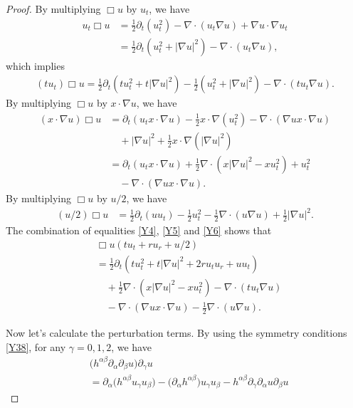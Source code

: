 \documentclass[10pt,a4paper]{amsart}
\begin{document}
\begin{proof}
By multiplying $\Box u$ by $u_t$, we have
\begin{align}\label{Y3}
u_t\Box u&=\frac12\partial_t(u_t^2)-\nabla\cdot(u_t\nabla
u)+\nabla u\cdot\nabla u_t
\nonumber\\&=\frac12\partial_t(u_t^2+|\nabla
u|^2)-\nabla\cdot(u_t\nabla u),
\end{align}
which implies
\begin{align}\label{Y4}
(tu_t)\Box u=\frac12\partial_t(tu_t^2+t|\nabla
u|^2)-\frac12(u_t^2+|\nabla u|^2)-\nabla\cdot(tu_t\nabla u).
\end{align}
By multiplying $\Box u$ by $x\cdot\nabla u$, we have
\begin{align}\label{Y5}
(x\cdot\nabla u)\Box u&=\partial_t(u_tx\cdot\nabla
u)-\frac12x\cdot\nabla(u_t^2)-\nabla\cdot(\nabla ux\cdot\nabla u)
\nonumber\\&\quad+|\nabla u|^2+\frac12x\cdot\nabla(|\nabla u|^2)
\nonumber\\&=\partial_t(u_tx\cdot\nabla
u)+\frac12\nabla\cdot(x|\nabla
u|^2-xu_t^2)+u_t^2\nonumber\\&\quad-\nabla\cdot(\nabla ux\cdot\nabla
u).
\end{align}
By multiplying $\Box u$ by $u/2$, we have
\begin{align}\label{Y6}
(u/2)\Box
u&=\frac12\partial_t(uu_t)-\frac12u_t^2-\frac12\nabla\cdot(u\nabla
u)+\frac12|\nabla u|^2.
\end{align}
The combination of equalities \eqref{Y4}, \eqref{Y5} and \eqref{Y6}
shows that
\begin{align}\label{Y7}
&\Box
u(tu_t+ru_r+u/2)\nonumber\\&=\frac12\partial_t(tu_t^2+t|\nabla
u|^2+2ru_tu_r+uu_t)\nonumber\\&\quad+\frac12\nabla\cdot(x|\nabla
u|^2-xu_t^2)-\nabla\cdot(tu_t\nabla
u)\nonumber\\&\quad-\nabla\cdot(\nabla ux\cdot\nabla
u)-\frac12\nabla\cdot(u\nabla u).
\end{align}
\par Now let's calculate the perturbation terms. By using the symmetry conditions \eqref{Y38}, for any $\gamma=0,1,2$, we have
\begin{align*}
&\big(h^{\alpha\beta}\partial_{\alpha}\partial_{\beta}u\big)\partial_{\gamma}u
\\&=\partial_{\alpha}\big(h^{\alpha\beta}u_{\gamma}u_{\beta}\big)
-\big(\partial_{\alpha}h^{\alpha\beta}\big)u_{\gamma}u_{\beta}-h^{\alpha\beta}\partial_{\gamma}\partial_{\alpha}u\partial_{\beta}u

\end{align*}
\end{proof}
\end{document}
